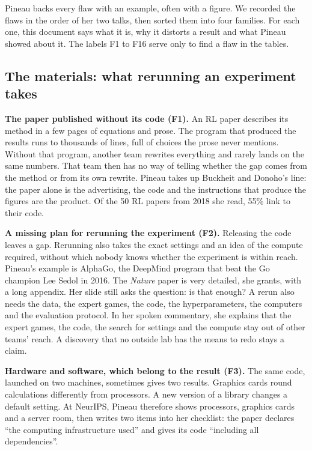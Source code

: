 \documentclass[11pt,a4paper]{article}
\begin{document}
Pineau backs every flaw with an example, often with a figure. We
recorded the flaws in the order of her two talks, then sorted them into
four families. For each one, this document says what it is, why it
distorts a result and what Pineau showed about it. The labels F1 to F16
serve only to find a flaw in the tables.

\subsection{The materials: what rerunning an experiment
takes}\label{the-materials-what-rerunning-an-experiment-takes}

\textbf{The paper published without its code (F1).} An RL paper
describes its method in a few pages of equations and prose. The program
that produced the results runs to thousands of lines, full of choices
the prose never mentions. Without that program, another team rewrites
everything and rarely lands on the same numbers. That team then has no
way of telling whether the gap comes from the method or from its own
rewrite. Pineau takes up Buckheit and Donoho's line: the paper alone is
the advertising, the code and the instructions that produce the figures
are the product. Of the 50 RL papers from 2018 she read, 55\% link to
their code.

\textbf{A missing plan for rerunning the experiment (F2).} Releasing the
code leaves a gap. Rerunning also takes the exact settings and an idea
of the compute required, without which nobody knows whether the
experiment is within reach. Pineau's example is AlphaGo, the DeepMind
program that beat the Go champion Lee Sedol in 2016. The \emph{Nature}
paper is very detailed, she grants, with a long appendix. Her slide
still asks the question: is that enough? A rerun also needs the data,
the expert games, the code, the hyperparameters, the computers and the
evaluation protocol. In her spoken commentary, she explains that the
expert games, the code, the search for settings and the compute stay out
of other teams' reach. A discovery that no outside lab has the means to
redo stays a claim.

\textbf{Hardware and software, which belong to the result (F3).} The
same code, launched on two machines, sometimes gives two results.
Graphics cards round calculations differently from processors. A new
version of a library changes a default setting. At NeurIPS, Pineau
therefore shows processors, graphics cards and a server room, then
writes two items into her checklist: the paper declares ``the computing
infrastructure used'' and gives its code ``including all dependencies''.
\end{document}
